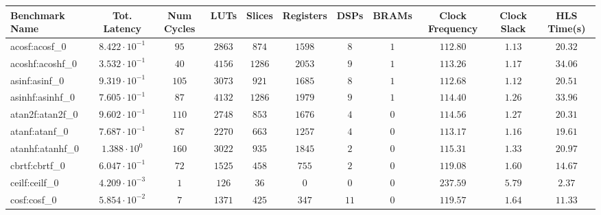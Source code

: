 \begin{tabular}{|l|c|c|c|c|c|c|c|c|c|c|}
\hline
Benchmark Name               & Tot. Latency            & Num Cycles & LUTs      & Slices    & Registers & DSPs    & BRAMs & Clock Frequency & Clock Slack & HLS Time(s) \\
\hline
acosf:acosf\_0               & $ 8.422 \cdot 10^{-1} $ & $ 95     $ & $ 2863  $ & $ 874   $ & $ 1598  $ & $ 8   $ & $ 1 $ & $ 112.80      $ & $ 1.13    $ & $ 20.32   $ \\
acoshf:acoshf\_0             & $ 3.532 \cdot 10^{-1} $ & $ 40     $ & $ 4156  $ & $ 1286  $ & $ 2053  $ & $ 9   $ & $ 1 $ & $ 113.26      $ & $ 1.17    $ & $ 34.06   $ \\
asinf:asinf\_0               & $ 9.319 \cdot 10^{-1} $ & $ 105    $ & $ 3073  $ & $ 921   $ & $ 1685  $ & $ 8   $ & $ 1 $ & $ 112.68      $ & $ 1.12    $ & $ 20.51   $ \\
asinhf:asinhf\_0             & $ 7.605 \cdot 10^{-1} $ & $ 87     $ & $ 4132  $ & $ 1286  $ & $ 1979  $ & $ 9   $ & $ 1 $ & $ 114.40      $ & $ 1.26    $ & $ 33.96   $ \\
atan2f:atan2f\_0             & $ 9.602 \cdot 10^{-1} $ & $ 110    $ & $ 2748  $ & $ 853   $ & $ 1676  $ & $ 4   $ & $ 0 $ & $ 114.56      $ & $ 1.27    $ & $ 20.31   $ \\
atanf:atanf\_0               & $ 7.687 \cdot 10^{-1} $ & $ 87     $ & $ 2270  $ & $ 663   $ & $ 1257  $ & $ 4   $ & $ 0 $ & $ 113.17      $ & $ 1.16    $ & $ 19.61   $ \\
atanhf:atanhf\_0             & $ 1.388 \cdot 10^{0}  $ & $ 160    $ & $ 3022  $ & $ 935   $ & $ 1845  $ & $ 2   $ & $ 0 $ & $ 115.31      $ & $ 1.33    $ & $ 20.97   $ \\
cbrtf:cbrtf\_0               & $ 6.047 \cdot 10^{-1} $ & $ 72     $ & $ 1525  $ & $ 458   $ & $ 755   $ & $ 2   $ & $ 0 $ & $ 119.08      $ & $ 1.60    $ & $ 14.67   $ \\
ceilf:ceilf\_0               & $ 4.209 \cdot 10^{-3} $ & $ 1      $ & $ 126   $ & $ 36    $ & $ 0     $ & $ 0   $ & $ 0 $ & $ 237.59      $ & $ 5.79    $ & $ 2.37    $ \\
cosf:cosf\_0                 & $ 5.854 \cdot 10^{-2} $ & $ 7      $ & $ 1371  $ & $ 425   $ & $ 347   $ & $ 11  $ & $ 0 $ & $ 119.57      $ & $ 1.64    $ & $ 11.33   $ \\

\end{tabular}
